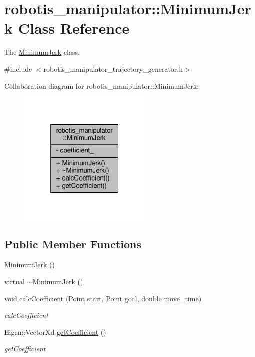 \hypertarget{classrobotis__manipulator_1_1_minimum_jerk}{}\section{robotis\+\_\+manipulator\+:\+:Minimum\+Jerk Class Reference}
\label{classrobotis__manipulator_1_1_minimum_jerk}


The \hyperlink{classrobotis__manipulator_1_1_minimum_jerk}{Minimum\+Jerk} class.  




{\ttfamily \#include $<$robotis\+\_\+manipulator\+\_\+trajectory\+\_\+generator.\+h$>$}



Collaboration diagram for robotis\+\_\+manipulator\+:\+:Minimum\+Jerk\+:\nopagebreak
\begin{figure}[H]
\begin{center}
\leavevmode
\includegraphics[width=181pt]{classrobotis__manipulator_1_1_minimum_jerk__coll__graph}
\end{center}
\end{figure}
\subsection*{Public Member Functions}
\begin{DoxyCompactItemize}
\item 
\hyperlink{classrobotis__manipulator_1_1_minimum_jerk_a9cb2cb3c451d6c1709f2cea01f0b8ce4}{Minimum\+Jerk} ()
\item 
virtual \hyperlink{classrobotis__manipulator_1_1_minimum_jerk_aad3345d5cde2785b5fc69e2d79ed39ae}{$\sim$\+Minimum\+Jerk} ()
\item 
void \hyperlink{classrobotis__manipulator_1_1_minimum_jerk_afd29204e588525a2688a74d2a9656354}{calc\+Coefficient} (\hyperlink{structrobotis__manipulator_1_1_point}{Point} start, \hyperlink{structrobotis__manipulator_1_1_point}{Point} goal, double move\+\_\+time)
\begin{DoxyCompactList}\small\item\em calc\+Coefficient \end{DoxyCompactList}\item 
Eigen\+::\+Vector\+Xd \hyperlink{classrobotis__manipulator_1_1_minimum_jerk_a1610599c85567422e492e0893e02cc34}{get\+Coefficient} ()
\begin{DoxyCompactList}\small\item\em get\+Coefficient \end{DoxyCompactList}\end{DoxyCompactItemize}
